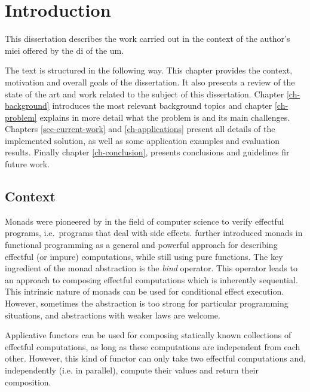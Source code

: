 \documentclass[
  oneside,
  11pt, a4paper,
  footinclude=true,
  headinclude=true,
  cleardoublepage=empty
]{scrbook}
\theoremstyle{definition}
\theoremstyle{definition}
\begin{document}
	\chapter{Introduction}
        This dissertation describes the work carried out in the context of the author's \gls{miei} offered by the \gls{di} of the \gls{um}.
        
        The text is structured in the following way. This chapter provides the context, motivation and overall goals of the dissertation. It also presents a review of the state of the art and work related to the subject of this dissertation. Chapter \ref{ch-background} introduces the most relevant background topics and chapter \ref{ch-problem} explains in more detail what the problem is and its main challenges. Chapters \ref{sec-current-work} and \ref{ch-applications} present all details of the implemented solution, as well as some application examples and evaluation results. Finally chapter \ref{ch-conclusion}, presents conclusions and guidelines fir future work.
		
    \section{Context}\label{sec-context}
    
    Monads were pioneered by \cite{Moggi:1991:NCM:116981.116984} in the field of computer science to verify effectful programs, i.e.\ programs that deal with side effects. \cite{Wadler:1989:TF:99370.99404} further introduced monads in functional programming as a general and powerful approach for describing effectful (or impure) computations, while still using pure functions. The key ingredient of the monad abstraction is the \textit{bind} operator. This operator leads to an approach to composing effectful computations which is inherently sequential. This intrinsic nature of monads can be used for conditional effect execution. However, sometimes the abstraction is too strong for particular programming situations, and abstractions with weaker laws are welcome.

    Applicative functors \citep{mcbride2008applicative} can be used for composing statically known collections of effectful computations, as long as these computations are independent from each other. However, this kind of functor can only take two effectful computations and, independently (i.e. in parallel), compute their values and return their composition.
\end{document}
